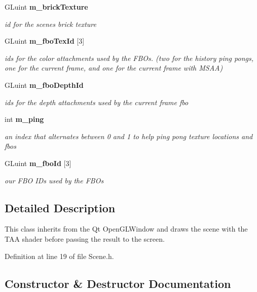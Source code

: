 \begin{DoxyCompactItemize}
G\+Luint \textbf{ m\+\_\+brick\+Texture}
\begin{DoxyCompactList}\small\item\em id for the scene\textquotesingle{}s brick texture \end{DoxyCompactList}\item 
G\+Luint \textbf{ m\+\_\+fbo\+Tex\+Id} [3]
\begin{DoxyCompactList}\small\item\em ids for the color attachments used by the F\+B\+Os. (two for the history ping pongs, one for the current frame, and one for the current frame with M\+S\+AA) \end{DoxyCompactList}\item 
G\+Luint \textbf{ m\+\_\+fbo\+Depth\+Id}
\begin{DoxyCompactList}\small\item\em ids for the depth attachments used by the current frame fbo \end{DoxyCompactList}\item 
int \textbf{ m\+\_\+ping}
\begin{DoxyCompactList}\small\item\em an index that alternates between 0 and 1 to help ping pong texture locations and fbos \end{DoxyCompactList}\item 
G\+Luint \textbf{ m\+\_\+fbo\+Id} [3]
\begin{DoxyCompactList}\small\item\em our F\+BO I\+Ds used by the F\+B\+Os \end{DoxyCompactList}\end{DoxyCompactItemize}


\subsection{Detailed Description}
This class inherits from the Qt Open\+G\+L\+Window and draws the scene with the T\+AA shader before passing the result to the screen. 

Definition at line 19 of file Scene.\+h.



\subsection{Constructor \& Destructor Documentation}
\mbox{\label{class_scene_ad10176d75a9cc0da56626f682d083507}} 
